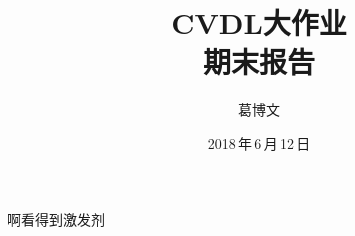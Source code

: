 \documentclass[a4paper,12pt]{article}
\begin{document}
\begin{CJK*}{UTF8}{gbsn}

\title{\textbf{CVDL大作业\\期末报告}}
\author{葛博文}
\date{2018\,年\,6\,月\,12\,日}
\maketitle

\begin{spacing}{1.2}

    啊看得到激发剂
\end{spacing}
\end{CJK*}
\end{document}
